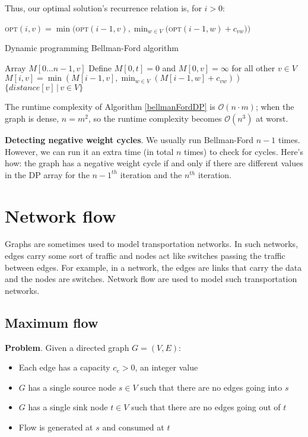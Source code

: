 \documentclass{article}
\newcommand{\Oh}{\mathcal{O}}
\newcommand{\OPT}{\textsc{opt}}
\begin{document}
Thus, our optimal solution's recurrence relation is, for $i > 0$:

\OPT$(i, v) = \min($\OPT$(i-1, v), \min_{w \in V}($\OPT$(i - 1, w) + c_{vw}))$

\begin{algorithm}
\caption{Dynamic programming Bellman-Ford algorithm}\label{bellmanFordDP}
\begin{algorithmic}[1]
\State Array $M[0 \dots n - 1, v]$
\State Define $M[0, t] = 0$ and $M[0, v] = \infty$ for all other $v \in V$
        \State $M[i, v] = \min(M[i - 1, v], \min_{w \in V}(M[i - 1, w] + c_{vw}))$
    \EndFor
\EndFor
\State \Return $\{distance[v] \, | \, v \in V\}$
\EndProcedure
\end{algorithmic}
\end{algorithm}

The runtime complexity of Algorithm \ref{bellmanFordDP} is $\Oh(n \cdot m)$; when the graph is dense, $n = m^2$, so the runtime complexity becomes $\Oh(n^3)$ at worst.

\textbf{Detecting negative weight cycles}. We usually run Bellman-Ford $n - 1$ times. However, we can run it an extra time (in total $n$ times) to check for cycles. Here's how: the graph has a negative weight cycle if and only if there are different values in the DP array for the $n - 1^{th}$ iteration and the $n^{th}$ iteration.

\section{Network flow}
Graphs are sometimes used to model transportation networks. In such networks, edges carry some sort of traffic and nodes act like switches passing the traffic between edges. For example, in a network, the edges are links that carry the data and the nodes are switches. Network flow are used to model such transportation networks.

\subsection{Maximum flow}

\textbf{Problem}. Given a directed graph $G = (V, E)$:
\begin{itemize}
    \item Each edge has a capacity $c_e > 0$, an integer value
    \item $G$ has a single source node $s \in V$ such that there are no edges going into $s$
    \item $G$ has a single sink node $t \in V$ such that there are no edges going out of $t$
    \item Flow is generated at $s$ and consumed at $t$
\end{itemize}
\end{document}
